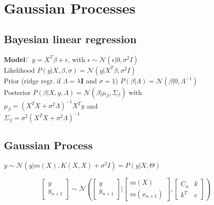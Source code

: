\section{Gaussian Processes}

\subsection*{Bayesian linear regression}
	\textbf{Model}:  \= $y = X^T \beta + \epsilon$, with $\epsilon \sim
	\mathcal{N}(\epsilon | 0, \sigma^2 I)$\\ 
	Likelihood $P(y | X, \beta, \sigma) = \mathcal{N}(y | X^T \beta , \sigma^2 I)$\\
	Prior (ridge regr. if $\Lambda = \lambda\mathbf{I}$ and $\sigma=1$) $P(\beta | \Lambda) = \mathcal{N} (\beta | 0, \Lambda^{-1})$\\ Posterior $P(\beta | X, y, \Lambda) = \mathcal{N}(\beta | \mu_\beta, \Sigma_\beta)$ with \\
	$\mu_\beta = (X^T X + \sigma^2 \Lambda)^{-1} X^T y$ and \\
	$\Sigma_\beta = \sigma^2(X^T X + \sigma^2 \Lambda)^{-1}$ \\

\subsection*{Gaussian Process}
    $y \sim \mathcal{N}(y | m(X), K(X,X) + \sigma^2 I) = P(y|X,\Theta)$ 
    
                        
    $$\left[\begin{smallmatrix} y \\y_{n+1}\end{smallmatrix}\right] \sim \mathcal{N}\left(\left[\begin{smallmatrix} y \\y_{n+1}\end{smallmatrix}\right]|[\begin{smallmatrix} m(X) \\m(x_{n+1})\end{smallmatrix}], [\begin{smallmatrix} C_n & k \\ k^T & c\end{smallmatrix}]\right)$$
    	
